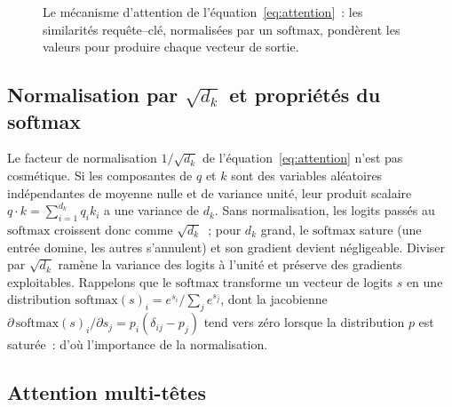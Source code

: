 \documentclass[12pt,a4paper,oneside]{report}
\theoremstyle{definition}
\theoremstyle{plain}
\begin{document}
\begin{figure}[ht]
\centering
{}
\caption{Le mécanisme d'attention de l'équation~\eqref{eq:attention}~: les
similarités requête--clé, normalisées par un $\mathrm{softmax}$, pondèrent les
valeurs pour produire chaque vecteur de sortie.}
\label{fig:attn}
\end{figure}

\subsection{Normalisation par \texorpdfstring{$\sqrt{d_k}$}{sqrt(dk)} et propriétés du softmax}

Le facteur de normalisation $1/\sqrt{d_k}$ de l'équation~\eqref{eq:attention}
n'est pas cosmétique. Si les composantes de $q$ et $k$ sont des variables
aléatoires indépendantes de moyenne nulle et de variance unité, leur produit
scalaire $q\cdot k = \sum_{i=1}^{d_k} q_i k_i$ a une variance de $d_k$. Sans
normalisation, les logits passés au $\mathrm{softmax}$ croissent donc comme
$\sqrt{d_k}$~; pour $d_k$ grand, le $\mathrm{softmax}$ sature (une entrée domine,
les autres s'annulent) et son gradient devient négligeable. Diviser par
$\sqrt{d_k}$ ramène la variance des logits à l'unité et préserve des gradients
exploitables. Rappelons que le $\mathrm{softmax}$ transforme un vecteur de logits
$s$ en une distribution $\mathrm{softmax}(s)_i = e^{s_i}/\sum_j e^{s_j}$, dont la
jacobienne $\partial\,\mathrm{softmax}(s)_i/\partial s_j = p_i(\delta_{ij} - p_j)$
tend vers zéro lorsque la distribution $p$ est saturée~: d'où l'importance de la
normalisation.

\subsection{Attention multi-têtes}
\end{document}
